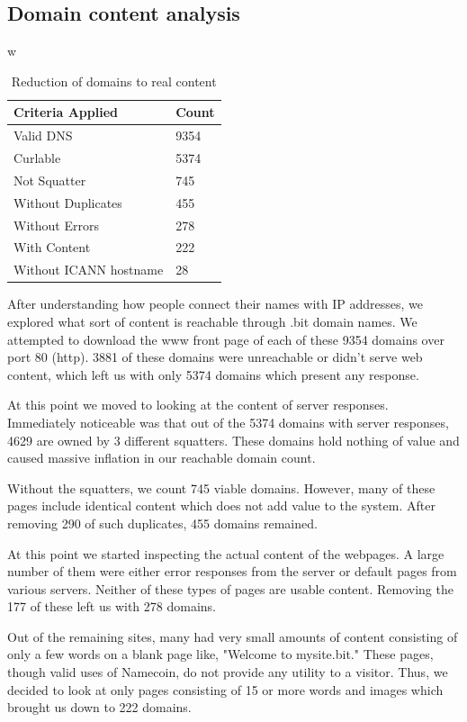 \subsection{Domain content analysis}
\label{domainbreakdown}

w\begin{table}[t]
\begin{tabular}{ll}
Criteria Applied & Count \\ \hline
Valid DNS          &  9354  \\
Curlable        & 5374     \\
Not Squatter        & 745     \\
Without Duplicates      & 455     \\
Without Errors              & 278    \\
With Content              & 222    \\
Without ICANN hostname   & 28   \\
\end{tabular}
\caption{Reduction of domains to real content}
\end{table}

After understanding how people connect their names with IP addresses, we explored what sort of content is reachable through .bit domain names. We attempted to download the www front page of each of these 9354 domains over port 80 (http). 3881 of these domains were unreachable or didn't serve web content, which left us with only 5374 domains which present any response.

At this point we moved to looking at the content of server responses. Immediately noticeable was that out of the 5374 domains with server responses, 4629 are owned by 3 different squatters. These domains hold nothing of value and caused massive inflation in our reachable domain count.

Without the squatters, we count 745 viable domains. However, many of these pages include identical content which does not add value to the system. After removing 290 of such duplicates, 455 domains remained.

At this point we started inspecting the actual content of the webpages. A large number of them were either error responses from the server or default pages from various servers. Neither of these types of pages are usable content. Removing the 177 of these left us with 278 domains.

Out of the remaining sites, many had very small amounts of content consisting of only a few words on a blank page like, "Welcome to mysite.bit." These pages, though valid uses of Namecoin, do not provide any utility to a visitor. Thus, we decided to look at only pages consisting of 15 or more words and images which brought us down to 222 domains.

